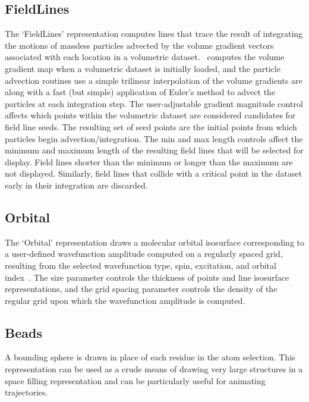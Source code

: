 \subsection{FieldLines}
\label{ug:topic:drawmethods:fieldlines}
The `FieldLines' representation computes lines that trace the result
of integrating the motions of massless particles advected by the 
volume gradient vectors associated with each location in a volumetric
dataset.  \VMD\ computes the volume gradient map when a volumetric dataset
is initially loaded, and the particle advection routines use a simple
trilinear interpolation of the volume gradients are along with a fast
(but simple) application of Euler's method to advect the particles at 
each integration step.  The user-adjustable gradient magnitude control
affects which points within the volumetric dataset are considered 
candidates for field line seeds.  The resulting set of seed points
are the initial points from which particles begin advection/integration.
The min and max length controls affect the minimum and maximum length of
the resulting field lines that will be selected for display.  Field lines
shorter than the minimum or longer than the maximum are not displayed.
Similarly, field lines that collide with a critical point in the dataset
early in their integration are discarded.


\subsection{Orbital}
\label{ug:topic:drawmethods:orbital}
The `Orbital' representation draws a molecular orbital isosurface 
corresponding to a user-defined wavefunction amplitude computed on a 
regularly spaced grid, resulting from the selected wavefunction type,
spin, excitation, and orbital index~\cite{STON2009,STON2011A}.  
The size parameter controls the thickness of points and line 
isosurface representations, and the grid spacing parameter controls 
the density of the regular grid upon which the wavefunction amplitude 
is computed.


\subsection{Beads}
\label{ug:topic:drawmethods:beads}
A bounding sphere is drawn in place of each residue in the atom selection.
This representation can be used as a crude means of drawing very large
structures in a space filling representation and can be particularly useful
for animating trajectories.

